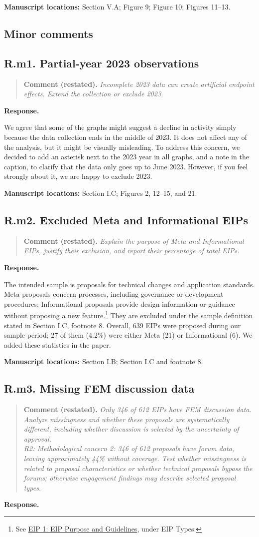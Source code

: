 \documentclass[11pt,letterpaper]{article}
\newcommand{\point}[3]{%
  \Needspace{7\baselineskip}
  \subsection*{#1. #2}\phantomsection\label{pt:#1}%
  \begin{quote}\small\textbf{Comment (restated).} \textit{#3}\end{quote}%
  \textbf{Response.}\enspace\ignorespaces}
\newcommand{\locations}[1]{\par{\small\textbf{Manuscript locations:} #1.}\par}
\begin{document}
\locations{Section V.A; Figure 9; Figure 10; Figures 11--13}

\subsection*{Minor comments}

\point{R.m1}{Partial-year 2023 observations}{Incomplete 2023 data can create artificial endpoint effects. Extend the collection or exclude 2023.}

We agree that some of the graphs might suggest a decline in activity simply because the data collection ends in the middle of 2023. It does not affect any of the analysis, but it might be visually misleading. To address this concern, we decided to add an asterisk next to the 2023 year in all graphs, and a note in the caption, to clarify that the data only goes up to June 2023. However, if you feel strongly about it, we are happy to exclude 2023.

\locations{Section I.C; Figures 2, 12--15, and 21}

\point{R.m2}{Excluded Meta and Informational EIPs}{Explain the purpose of Meta and Informational EIPs, justify their exclusion, and report their percentage of total EIPs.}

The intended sample is proposals for technical changes and application standards. Meta proposals concern processes, including governance or development procedures; Informational proposals provide design information or guidance without proposing a new feature.\footnote{See \href{https://eips.ethereum.org/EIPS/eip-1}{EIP 1: EIP Purpose and Guidelines}, under EIP Types.} They are excluded under the sample definition stated in Section I.C, footnote 8. Overall, 639 EIPs were proposed during our sample period; 27 of them (4.2\%) were either Meta (21) or Informational (6). We added these statistics in the paper. 



\locations{Section I.B; Section I.C and footnote 8}

\point{R.m3}{Missing FEM discussion data}{Only 346 of 612 EIPs have FEM discussion data. Analyze missingness and whether these proposals are systematically different, including whether discussion is selected by the uncertainty of approval.\\
R2: Methodological concern 2: 346 of 612 proposals have forum data, leaving approximately 44\% without coverage. Test whether missingness is related to proposal characteristics or whether technical proposals bypass the forums; otherwise engagement findings may describe selected proposal types.}
\end{document}

